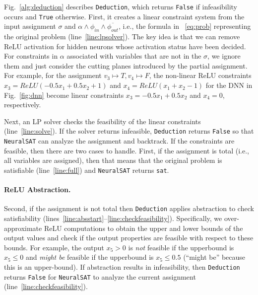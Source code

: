 \documentclass[oneside,11pt,dvipsnames]{book}
\numberwithin{equation}{section}
\theoremstyle{definition}
\theoremstyle{remark}
\newcommand{\hd}[1]{\iftoggle{usecomment}{{\color{blue}{[HD]: #1}}}{}}
\newcommand{\tool}{\texttt{NeuralSAT}}
\begin{document}


Fig.~\ref{alg:deduction} describes \texttt{Deduction}, which returns \texttt{False} if infeasibility occurs and  \texttt{True} otherwise.
First, it creates a linear constraint system from the input assignment $\sigma$ and $\alpha \land \phi_{in} \land \overline{\phi_{out}}$, i.e., the formula in ~\autoref{eq:prob} representing the original problem  (line~\ref{line:lpsolver}).
The key idea is that we can remove ReLU activation for hidden neurons whose activation status have been decided.
For constraints in $\alpha$ associated with variables that are not in the $\sigma$,  we ignore them and just consider the cutting planes introduced by the partial assignment.
For example, for the assignment $v_3\mapsto T, v_4 \mapsto F$, the non-linear ReLU constraints $x_3=ReLU(-0.5x_1+0.5x_2+1)$ and  $x_4=ReLU(x_1+x_2-1)$ for the DNN in Fig.~\ref{fig:dnn} become linear constraints $x_3=-0.5x_1+0.5x_2$ and $x_4=0$, respectively.

Next, an LP solver checks the feasibility of the linear constraints (line~\ref{line:solve}).
If the solver returns infeasible,  \texttt{Deduction} returns \texttt{False} so that \tool{} can analyze the assignment and backtrack.
If the constraints are feasible, then there are two cases to handle. First, if the assignment is total (i.e., all variables are assigned), then that means that the original problem is satisfiable (line~\ref{line:full}) and \tool{} returns \texttt{sat}.

\paragraph{ReLU Abstraction.} Second, if the assignment is not total then \texttt{Deduction} applies abstraction to check satisfiability (lines~\ref{line:absstart}--\ref{line:checkfeasibility}).
Specifically, we over-approximate  ReLU computations to obtain the upper and lower bounds of the output values and check if the output properties are feasible with respect to these bounds. For example, the output $x_5 > 0$ is \emph{not} feasible if the upperbound is $x_5 \le 0$ and \emph{might be} feasible if the upperbound is $x_5 \le 0.5$ (``might be'' because this is an upper-bound). If abstraction results in infeasibility, then \texttt{Deduction} returns \texttt{False} for \tool{} to analyze the current assignment (line~\ref{line:checkfeasibility}).
\end{document}

